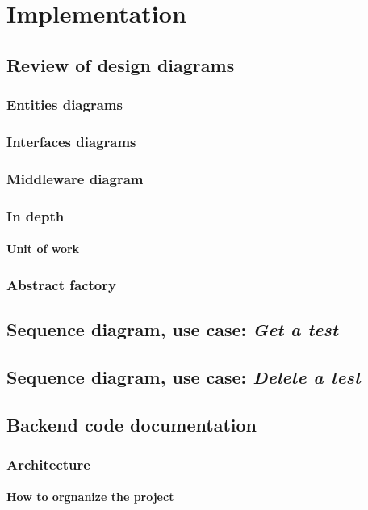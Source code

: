 \chapter{Implementation}

\section{Review of design diagrams}
    \subsection{Entities diagrams}
    \subsection{Interfaces diagrams}
    \subsection{Middleware diagram}
    \subsection{In depth}
        \subsubsection{Unit of work}
    \subsection{Abstract factory}
\section{Sequence diagram, use case: \textit{Get a test}}
\section{Sequence diagram, use case: \textit{Delete a test}}
\section{Backend code documentation}
    \subsection{Architecture}
        \subsubsection{How to orgnanize the project}
